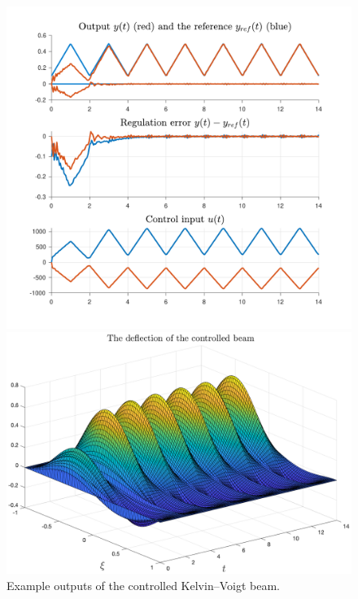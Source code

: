 \documentclass[11pt, a4paper]{amsart}
\theoremstyle{definition}
\numberwithin{equation}{section}
\begin{document}
\begin{figure}[h!]
  \begin{minipage}{0.48\linewidth}
    \begin{flushleft}
      \includegraphics[width=0.9\linewidth]{BKVoutputs.pdf}
    \end{flushleft}
  \end{minipage}
  \begin{minipage}{0.48\linewidth}
    \begin{flushright}
      \includegraphics[width=\linewidth]{BKVprofile.png}
    \end{flushright}
  \end{minipage}
    \caption{Example outputs of the controlled Kelvin--Voigt beam.}
  \label{fig:BeamKV}
\end{figure}
\end{document}
